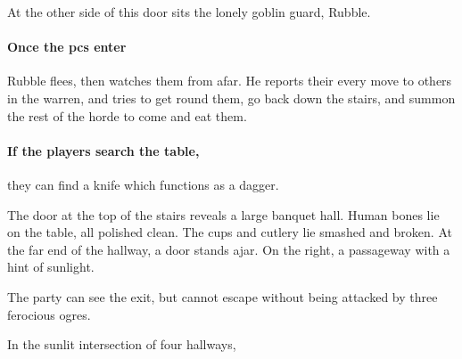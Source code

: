 \begin{multicols}{2}



At the other side of this door sits the lonely goblin guard, Rubble.

\paragraph{Once the \glspl{pc} enter}
Rubble flees, then watches them from afar.
He reports their every move to others in the warren, and tries to get round them, go back down the stairs, and summon the rest of the horde to come and eat them.



\paragraph{If the players search the table,}
they can find a knife which functions as a dagger.

\begin{boxtext}

  The door at the top of the stairs reveals a large banquet hall.
  Human bones lie on the table, all polished clean.
  The cups and cutlery lie smashed and broken.
  At the far end of the hallway, a door stands ajar.
  On the right, a passageway with a hint of sunlight.

\end{boxtext}


The party can see the exit, but cannot escape without being attacked by three ferocious ogres.

\begin{boxtext}

  In the sunlit intersection of four hallways,
  \iftoggle{hardcore}%
    {four ogres sit playing a game of dice.  Two are clad in black leather armour, with a massive sword by their side.
    Another sucks on a horse's uncooked head, while the third goes for a piss behind the staircase.}%
    {three ogres sit playing dice.
    Two are clad in black, leather armour, apparently pieced together from multiple suits.
    The third sits watching them play some dice game.}%

\end{boxtext}


\end{multicols}
